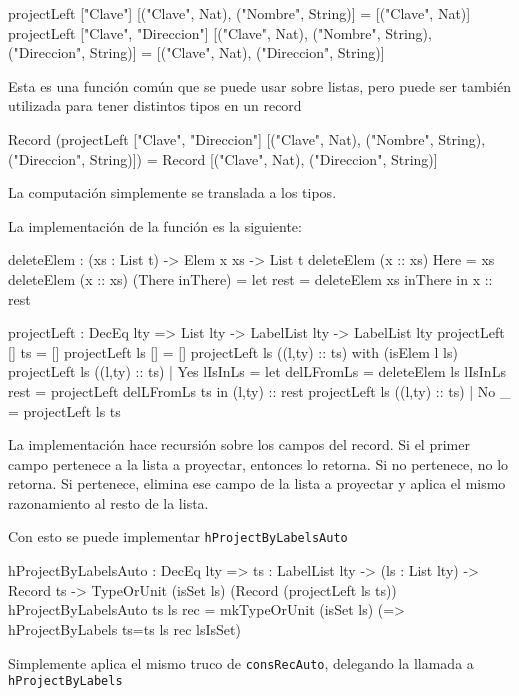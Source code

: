\begin{code}
projectLeft ["Clave"] 
 [("Clave", Nat), ("Nombre", String)] =
 [("Clave", Nat)]
projectLeft ["Clave", "Direccion"] 
 [("Clave", Nat), ("Nombre", String), ("Direccion", String)] =
 [("Clave", Nat), ("Direccion", String)]
\end{code}

Esta es una función común que se puede usar sobre listas, pero puede ser también utilizada para tener distintos tipos en un record

\begin{code}
Record (projectLeft ["Clave", "Direccion"] 
 [("Clave", Nat), ("Nombre", String), ("Direccion", String)]) =
Record [("Clave", Nat), ("Direccion", String)]
\end{code}

La computación simplemente se translada a los tipos.

La implementación de la función es la siguiente:

\begin{code}
deleteElem : (xs : List t) -> Elem x xs -> List t
deleteElem (x :: xs) Here = xs
deleteElem (x :: xs) (There inThere) =
  let rest = deleteElem xs inThere
  in x :: rest  

projectLeft : DecEq lty => List lty -> LabelList lty -> 
  LabelList lty
projectLeft [] ts = []
projectLeft ls [] = []
projectLeft ls ((l,ty) :: ts) with (isElem l ls)
  projectLeft ls ((l,ty) :: ts) | Yes lIsInLs = 
    let delLFromLs = deleteElem ls lIsInLs
        rest = projectLeft delLFromLs ts
    in (l,ty) :: rest
  projectLeft ls ((l,ty) :: ts) | No _ = projectLeft ls ts
\end{code}

La implementación hace recursión sobre los campos del record. Si el primer campo pertenece a la lista a proyectar, entonces lo retorna. Si no pertenece, no lo retorna. Si pertenece, elimina ese campo de la lista a proyectar y aplica el mismo razonamiento al resto de la lista.

Con esto se puede implementar \texttt{hProjectByLabelsAuto}

\begin{code}
hProjectByLabelsAuto : DecEq lty => {ts : LabelList lty} ->
  (ls : List lty) -> Record ts -> 
  TypeOrUnit (isSet ls) (Record (projectLeft ls ts))
hProjectByLabelsAuto {ts} ls rec = 
  mkTypeOrUnit (isSet ls) (\lsIsSet => 
    hProjectByLabels {ts=ts} ls rec lsIsSet)
\end{code}

Simplemente aplica el mismo truco de \texttt{consRecAuto}, delegando la llamada a \texttt{hProjectByLabels}

